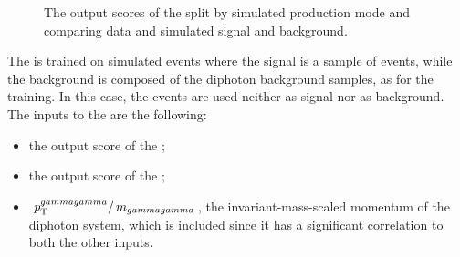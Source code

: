 \begin{figure}[h]
\centering
\caption{The output scores of the \DiJetBdt split by simulated production mode and comparing data and simulated signal and background.}
\label{fig:cat:dijet_bdt}
\end{figure}

The \DiPhoDiJetBdt is trained on simulated events where the signal is a sample of \VBF \Hgg events, while the background is composed of the \SM diphoton background samples, as for the \DiJetBdt training. In this case, the \ggH events are used neither as signal nor as background. The inputs to the \BDT are the following:
\begin{itemize}
\item the output score of the \DiPhoBdt;
\item the output score of the \DiJetBdt;
\item $\,p_\text{T}^{gammagamma}/\,m_{gammagamma}$, the invariant-mass-scaled momentum of the diphoton system, which is included since it has a significant correlation to both the other inputs.
\end{itemize}

